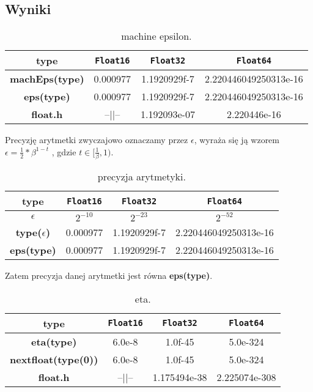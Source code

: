 \documentclass{article}
\begin{document}
\begin{center}
    \subsection{Wyniki}
    \begin{table}[h!]
    \centering
    \begin{tabular}{||c c c c||} 
    \hline
    \textbf{type} & \texttt{Float16} & \texttt{Float32} & \texttt{Float64} \\ [0.5ex]
    \hline\hline
    \textbf{machEps(type)} & 0.000977 & 1.1920929f-7 & 2.220446049250313e-16  \\ 
    \textbf{eps(type)} & 0.000977 & 1.1920929f-7 & 2.220446049250313e-16 \\
    \textbf{float.h} & --||-- & 1.192093e-07 & 2.220446e-16\\
    \hline
    \end{tabular}
    \caption{machine epsilon.}
    \label{table:1}
    \end{table}
    \large Precyzję arytmetki zwyczajowo oznaczamy przez \(\epsilon\), wyraża się ją wzorem \( \displaystyle \epsilon  = \frac{1}{2}*\beta^{1-t} \) , gdzie \(\displaystyle t \in [\frac{1}{\beta}, 1)\).\newpage
    \begin{table}[h!]
    \centering
    \begin{tabular}{||c c c c||} 
    \hline
    \textbf{type} & \texttt{Float16} & \texttt{Float32} & \texttt{Float64} \\ [0.5ex]
    \hline\hline
    \textbf{\(\epsilon\)} & \(2^{-10}\) & \(2^{-23}\) & \(2^{-52}\)  \\
    \textbf{type(\(\epsilon\))} & 0.000977 & 1.1920929f-7 & 2.220446049250313e-16 \\
    \textbf{eps(type)} & 0.000977 & 1.1920929f-7 & 2.220446049250313e-16 \\
    \hline
    \end{tabular}
    \caption{precyzja arytmetyki.}
    \label{table:2}
    \end{table}

    \large Zatem precyzja danej arytmetki jest równa \textbf{eps(type)}.

    \begin{table}[h!]
    \centering
    \begin{tabular}{||c c c c||} 
    \hline
    \textbf{type} & \texttt{Float16} & \texttt{Float32} & \texttt{Float64} \\ [0.5ex]
    \hline\hline
    \textbf{eta(type)} & 6.0e-8 & 1.0f-45 & 5.0e-324  \\ 
    \textbf{nextfloat(type(0))} & 6.0e-8 & 1.0f-45 & 5.0e-324 \\
    \textbf{float.h} & --||-- & 1.175494e-38 & 2.225074e-308\\
    \hline
    \end{tabular}
    \caption{eta.}
    \label{table:2}
    \end{table}
    

\end{center}
\end{document}
